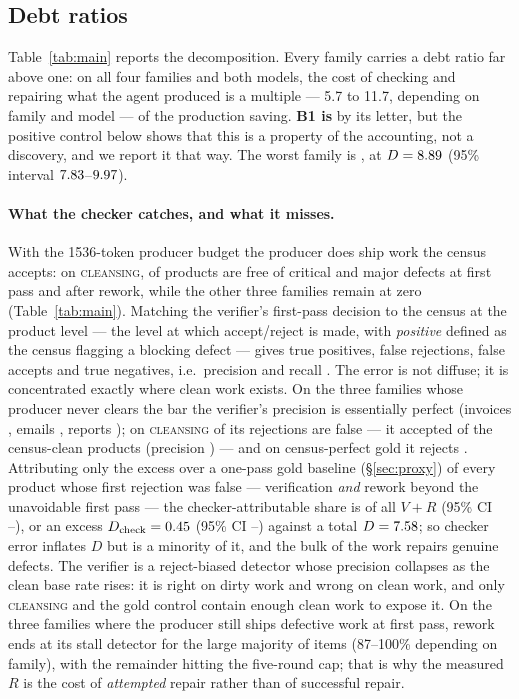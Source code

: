 \documentclass[11pt]{article}
\newcommand{\D}{\ensuremath{D}}
\newcommand{\VV}{\ensuremath{V}}
\newcommand{\RV}{\ensuremath{R}}
\newcommand{\famname}[1]{\textsc{#1}}
\begin{document}
\subsection{Debt ratios}

Table~\ref{tab:main} reports the decomposition. Every family carries a debt ratio far above one:
on all four families and both models, the cost of checking and repairing what the agent produced is
a multiple --- 5.7 to 11.7, depending on family and model --- of the production saving. \textbf{B1
is \VDbarB} by its letter, but the positive control below shows that this is a property of the
accounting, not a discovery, and we report it that way. The worst family is \VDworstFamily{}, at
$\D=\VDWorstD$ (95\% interval $7.83$--$9.97$).

\paragraph{What the checker catches, and what it misses.} With the 1536-token producer budget the
producer does ship work the census accepts: on \famname{cleansing}, \VDCleansePass{} of products are
free of critical and major defects at first pass and \VDCleanseFinal{} after rework, while the other
three families remain at zero (Table~\ref{tab:main}). Matching the verifier's first-pass decision to
the census at the product level --- the level at which accept/reject is made, with \emph{positive}
defined as the census flagging a blocking defect --- gives \VDdetTP{} true positives,
\VDdetFP{} false rejections, \VDdetFN{} false accepts and \VDdetTN{} true negatives, i.e.\ precision
\VDdetPrec{} and recall \VDdetRec{}. The error is not diffuse; it is concentrated exactly where clean
work exists. On the three families whose producer never clears the bar the verifier's precision is
essentially perfect (invoices \VDdetInvoicesPrec{}, emails \VDdetEmailsPrec{}, reports
\VDdetReportsPrec{}); on \famname{cleansing} \VDdetCleanseFalseRej{} of its rejections are false ---
it accepted \VDCleanseVerAcc{} of the \VDdetFP{} census-clean products (precision
\VDdetCleansePrec{}) --- and on census-perfect gold it rejects \VDgoldRej{}. Attributing only the excess over a one-pass gold baseline (\S\ref{sec:proxy}) of every product
whose first rejection was false --- verification \emph{and} rework beyond the unavoidable first
pass ---
the checker-attributable share is \VDchkShare{} of all $\VV+\RV$ (95\% CI \VDchkShareLo--\VDchkShareHi),
or an excess $\D_{\text{check}}=\VDchkD$ (95\% CI \VDchkDLo--\VDchkDHi) against a total
$\D=\VDchkDTotal$; so checker error inflates $\D$ but is a minority of it, and the bulk of the work
repairs genuine defects. The verifier is a reject-biased detector whose precision collapses as the clean base rate
rises: it is right on dirty work and wrong on clean work, and only \famname{cleansing} and the gold
control contain enough clean work to expose it. On the three families where the producer still ships
defective work at first pass, rework ends at its stall detector for the large majority of items
(87--100\% depending on family), with the remainder hitting the five-round cap; that is why the
measured $\RV$ is the cost of \emph{attempted} repair rather than of successful repair.
\end{document}
